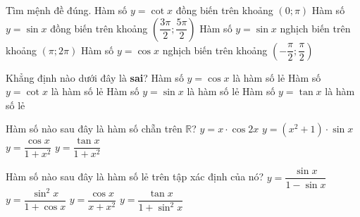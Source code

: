 \begin{ex}%
Tìm mệnh đề đúng.
\choice
{Hàm số $y=\cot x$ đồng biến trên khoảng $\left( 0;\pi \right)$}
{\True Hàm số $y=\sin x$ đồng biến trên khoảng $\left( \dfrac{3\pi }{2};\dfrac{5\pi }{2} \right)$}
{Hàm số $y=\sin x$ nghịch biến trên khoảng $\left( \pi ;2\pi \right)$}
{Hàm số $y=\cos x$ nghịch biến trên khoảng $\left( -\dfrac{\pi }{2};\dfrac{\pi }{2} \right)$}
\end{ex}
\begin{ex}%
Khẳng định nào dưới đây là \textbf{sai}?
\choice
{\True Hàm số $y=\cos x$ là hàm số lẻ}
{Hàm số $y=\cot x$ là hàm số lẻ}
{Hàm số $y=\sin x$ là hàm số lẻ}
{Hàm số $y=\tan x$ là hàm số lẻ}
\end{ex}
\begin{ex}%
Hàm số nào sau đây là hàm số chẵn trên $\mathbb{R}$?
\choice
{$y=x\cdot\cos 2x$}
{$y=\left( x^2+1 \right)\cdot\sin x$}
{\True $y=\dfrac{\cos x}{1+x^2}$}
{ $y=\dfrac{\tan x}{1+x^2}$}
\end{ex}
\begin{ex}%
Hàm số nào sau đây là hàm số lẻ trên tập xác định của nó?
\choice
{$y=\dfrac{\sin x}{1-\sin x}$}
{ $y=\dfrac{{{\sin }^2}x}{1+\cos x}$}
{$y=\dfrac{\cos x}{x+x^2}$}
{\True $y=\dfrac{\tan x}{1+{{\sin }^2}x}$}
\end{ex}

